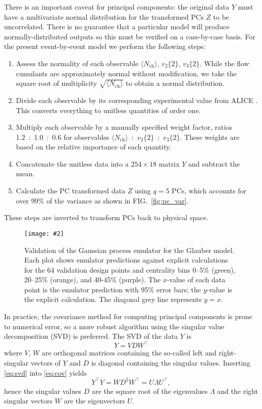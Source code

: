 \documentclass[aps,prc,reprint,superscriptaddress,amsmath]{revtex4-1}
\newcommand{\widefig}[3][t]{
  \begin{figure*}[#1]
    \texttt{[image: \#2]}
    \caption{\label{fig:#2}#3}
  \end{figure*}
}
\newcommand{\avg}[1]{\langle #1 \rangle}
\newcommand{\nch}{N_\text{ch}}
\newcommand{\vnk}[2]{v_#1\{#2\}}
\newcommand{\tran}{^\intercal}
\begin{document}
There is an important caveat for principal components:
the original data $Y$ must have a multivariate normal distribution for the transformed PCs $Z$ to be uncorrelated.
There is no guarantee that a particular model will produce normally-distributed outputs so this must be verified on a case-by-case basis.
For the present event-by-event model we perform the following steps:
\begin{enumerate}
  \item Assess the normality of each observable $\avg\nch$, $\vnk 2 2$, $\vnk 3 2$.
    While the flow cumulants are approximately normal without modification, we take the square root of multiplicity $\sqrt{\avg\nch}$ to obtain a normal distribution.
  \item Divide each observable by its corresponding experimental value from ALICE \cite{Abelev:2014mda}.
    This converts everything to unitless quantities of order one.
  \item Multiply each observable by a manually specified weight factor, ratios 1.2~:~1.0~:~0.6 for observables $\avg\nch$~:~$\vnk 2 2$~:~$\vnk 3 2$.
    These weights are based on the relative importance of each quantity.
  \item Concatenate the unitless data into a $254 \times 18$ matrix $Y$ and subtract the mean.
  \item Calculate the PC transformed data $Z$ using $q = 5$ PCs, which accounts for over 99\% of the variance as shown in FIG.~\ref{fig:pc_var}.
\end{enumerate}
These steps are inverted to transform PCs back to physical space.

\widefig{validation}{
  Validation of the Gaussian process emulator for the Glauber model.
  Each plot shows emulator predictions against explicit calculations for the 64 validation design points and centrality bins 0--5\% (green), 20--25\% (orange), and 40-45\% (purple).
  The $x$-value of each data point is the emulator prediction with 95\% error bars; the $y$-value is the explicit calculation.
  The diagonal grey line represents $y = x$.
}

In practice, the covariance method for computing principal components is prone to numerical error, so a more robust algorithm using the singular value decomposition (SVD) is preferred.
The SVD of the data $Y$ is
\begin{equation}
  Y = VDW\tran
  \label{eq:svd}
\end{equation}
where $V$, $W$ are orthogonal matrices containing the so-called left and right-singular vectors of $Y$ and $D$ is diagonal containing the singular values.
Inserting \eqref{eq:svd} into \eqref{eq:cov} yields
\begin{equation}
  Y\tran Y = W D^2 W\tran = U \Lambda U\tran,
\end{equation}
hence the singular values $D$ are the square root of the eigenvalues $\Lambda$ and the right singular vectors $W$ are the eigenvectors $U$.
\end{document}
